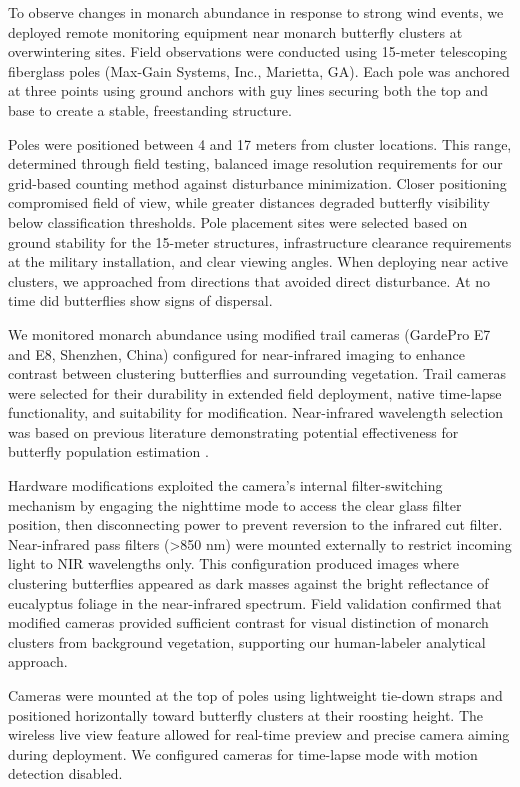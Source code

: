 To observe changes in monarch abundance in response to strong wind events, we deployed remote monitoring equipment near monarch butterfly clusters at overwintering sites. Field observations were conducted using 15-meter telescoping fiberglass poles (Max-Gain Systems, Inc., Marietta, GA). Each pole was anchored at three points using ground anchors with guy lines securing both the top and base to create a stable, freestanding structure. 

Poles were positioned between 4 and 17 meters from cluster locations. This range, determined through field testing, balanced image resolution requirements for our grid-based counting method against disturbance minimization. Closer positioning compromised field of view, while greater distances degraded butterfly visibility below classification thresholds. Pole placement sites were selected based on ground stability for the 15-meter structures, infrastructure clearance requirements at the military installation, and clear viewing angles. When deploying near active clusters, we approached from directions that avoided direct disturbance. At no time did butterflies show signs of dispersal. 

We monitored monarch abundance using modified trail cameras (GardePro E7 and E8, Shenzhen, China) configured for near-infrared imaging to enhance contrast between clustering butterflies and surrounding vegetation. Trail cameras were selected for their durability in extended field deployment, native time-lapse functionality, and suitability for modification. Near-infrared wavelength selection was based on previous literature demonstrating potential effectiveness for butterfly population estimation \autocite{hristov_estimating_2019}. 

Hardware modifications exploited the camera's internal filter-switching mechanism by engaging the nighttime mode to access the clear glass filter position, then disconnecting power to prevent reversion to the infrared cut filter. Near-infrared pass filters (>850 nm) were mounted externally to restrict incoming light to NIR wavelengths only. This configuration produced images where clustering butterflies appeared as dark masses against the bright reflectance of eucalyptus foliage in the near-infrared spectrum. Field validation confirmed that modified cameras provided sufficient contrast for visual distinction of monarch clusters from background vegetation, supporting our human-labeler analytical approach.

Cameras were mounted at the top of poles using lightweight tie-down straps and positioned horizontally toward butterfly clusters at their roosting height. The wireless live view feature allowed for real-time preview and precise camera aiming during deployment. We configured cameras for time-lapse mode with motion detection disabled. 

